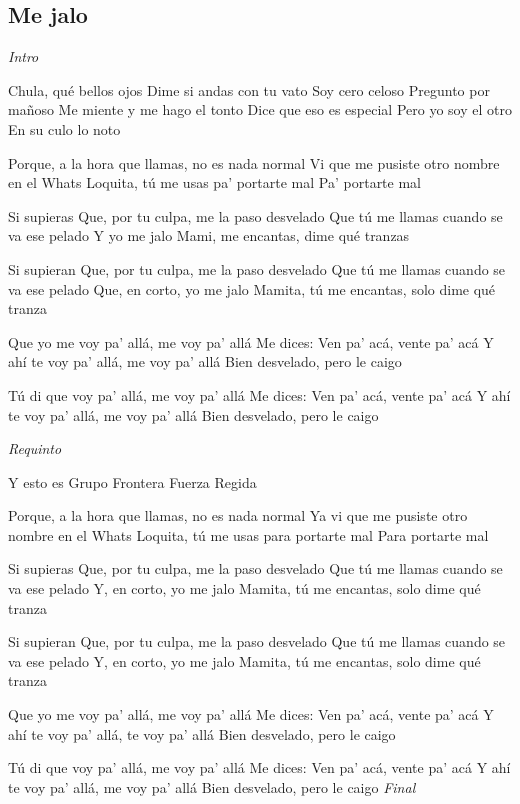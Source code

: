 \subsection{Me jalo}
\noindent

\vspace{1cm}

\begin{guitar}
	\begin{multicols}{2}

		\textit{Intro}

		Chula, qué bellos ojos
	Dime si andas con tu vato
	Soy cero celoso
	Pregunto por mañoso
	Me miente y me hago el tonto
	Dice que eso es especial
	Pero yo soy el otro
	En su culo lo noto

	Porque, a la hora que llamas, no es nada normal
	Vi que me pusiste otro nombre en el Whats
	Loquita, tú me usas pa' portarte mal
	Pa’ portarte mal

	Si supieras
	Que, por tu culpa, me la paso desvelado
	Que tú me llamas cuando se va ese pelado
	Y yo me jalo
	Mami, me encantas, dime qué tranzas

	Si supieran
	Que, por tu culpa, me la paso desvelado
	Que tú me llamas cuando se va ese pelado
	Que, en corto, yo me jalo
	Mamita, tú me encantas, solo dime qué tranza

	Que yo me voy pa' allá, me voy pa' allá
	Me dices: Ven pa’ acá, vente pa' acá
	Y ahí te voy pa' allá, me voy pa' allá
	Bien desvelado, pero le caigo

	Tú di que voy pa' allá, me voy pa' allá
	Me dices: Ven pa' acá, vente pa' acá
	Y ahí te voy pa’ allá, me voy pa’ allá
	Bien desvelado, pero le caigo

	\par
	\textit{Requinto}

	Y esto es Grupo Frontera
	Fuerza Regida
	\par

	Porque, a la hora que llamas, no es nada normal
	Ya vi que me pusiste otro nombre en el Whats
	Loquita, tú me usas para portarte mal
	Para portarte mal

	Si supieras
	Que, por tu culpa, me la paso desvelado
	Que tú me llamas cuando se va ese pelado
	Y, en corto, yo me jalo
	Mamita, tú me encantas, solo dime qué tranza

	Si supieran
	Que, por tu culpa, me la paso desvelado
	Que tú me llamas cuando se va ese pelado
	Y, en corto, yo me jalo
	Mamita, tú me encantas, solo dime qué tranza

	Que yo me voy pa' allá, me voy pa’ allá
	Me dices: Ven pa' acá, vente pa' acá
	Y ahí te voy pa' allá, te voy pa’ allá
	Bien desvelado, pero le caigo

	Tú di que voy pa' allá, me voy pa' allá
	Me dices: Ven pa' acá, vente pa' acá
	Y ahí te voy pa' allá, me voy pa' allá
	Bien desvelado, pero le caigo
		\textit{Final}
	\end{multicols}
\end{guitar}
